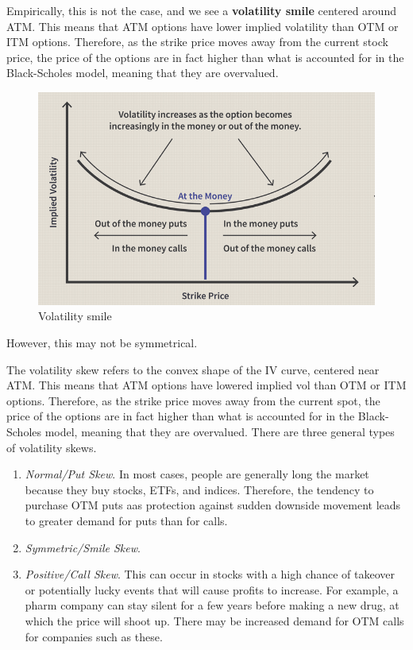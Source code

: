 \documentclass{article}
\begin{document}
    \begin{definition}
      Empirically, this is not the case, and we see a \textbf{volatility smile} centered around ATM. This means that ATM options have lower implied volatility than OTM or ITM options. Therefore, as the strike price moves away from the current stock price, the price of the options are in fact higher than what is accounted for in the Black-Scholes model, meaning that they are overvalued.  
      \begin{figure}[H]
        \centering 
        \includegraphics[scale=0.4]{img/vol_smile.png}
        \caption{Volatility smile} 
        \label{fig:vol_smile}
      \end{figure}
    \end{definition}

    However, this may not be symmetrical. 

    \begin{definition}
      The volatility skew refers to the convex shape of the IV curve, centered near ATM. This means that ATM options have lowered implied vol than OTM or ITM options. Therefore, as the strike price moves away from the current spot, the price of the options are in fact higher than what is accounted for in the Black-Scholes model, meaning that they are overvalued. There are three general types of volatility skews.

      \begin{enumerate}
        \item \textit{Normal/Put Skew}. In most cases, people are generally long the market because they buy stocks, ETFs, and indices. Therefore, the tendency to purchase OTM puts aas protection against sudden downside movement leads to greater demand for puts than for calls.
        \item \textit{Symmetric/Smile Skew}.
        \item \textit{Positive/Call Skew}. This can occur in stocks with a high chance of takeover or potentially lucky events that will cause profits to increase. For example, a pharm company can stay silent for a few years before making a new drug, at which the price will shoot up. There may be increased demand for OTM calls for companies such as these.
      \end{enumerate}
    \end{definition}
\end{document}
